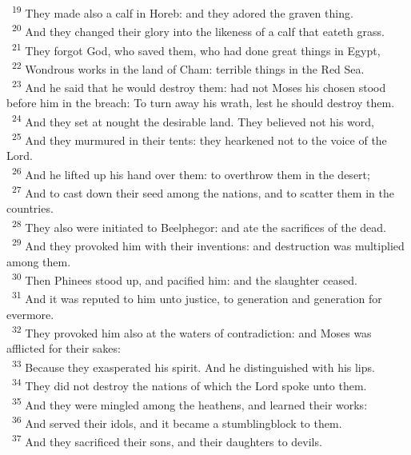 \documentclass[a5paper,12pt]{article}
\begin{document}
\begin{multicols*}{2}
~\textsuperscript{19} They made also a calf in Horeb: and they adored the graven thing.\\
~\textsuperscript{20} And they changed their glory into the likeness of a calf that eateth grass.\\
~\textsuperscript{21} They forgot God, who saved them, who had done great things in Egypt,\\
~\textsuperscript{22} Wondrous works in the land of Cham: terrible things in the Red Sea.\\
~\textsuperscript{23} And he said that he would destroy them: had not Moses his chosen stood before him in the breach: To turn away his wrath, lest he should destroy them.\\
~\textsuperscript{24} And they set at nought the desirable land. They believed not his word,\\
~\textsuperscript{25} And they murmured in their tents: they hearkened not to the voice of the Lord.\\
~\textsuperscript{26} And he lifted up his hand over them: to overthrow them in the desert;\\
~\textsuperscript{27} And to cast down their seed among the nations, and to scatter them in the countries.\\
~\textsuperscript{28} They also were initiated to Beelphegor: and ate the sacrifices of the dead.\\
~\textsuperscript{29} And they provoked him with their inventions: and destruction was multiplied among them.\\
~\textsuperscript{30} Then Phinees stood up, and pacified him: and the slaughter ceased.\\
~\textsuperscript{31} And it was reputed to him unto justice, to generation and generation for evermore.\\
~\textsuperscript{32} They provoked him also at the waters of contradiction: and Moses was afflicted for their sakes:\\
~\textsuperscript{33} Because they exasperated his spirit. And he distinguished with his lips.\\
~\textsuperscript{34} They did not destroy the nations of which the Lord spoke unto them.\\
~\textsuperscript{35} And they were mingled among the heathens, and learned their works:\\
~\textsuperscript{36} And served their idols, and it became a stumblingblock to them.\\
~\textsuperscript{37} And they sacrificed their sons, and their daughters to devils.\\

\end{multicols*}
\end{document}
